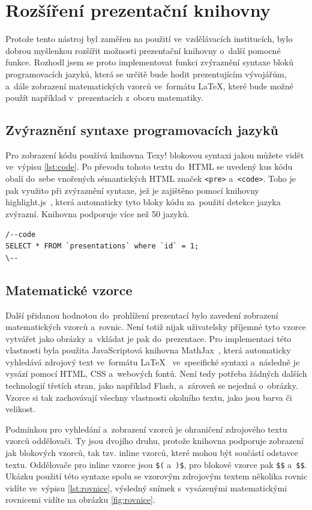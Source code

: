 \documentclass[11pt,twoside,a4paper]{book}
\begin{document}
\section{Rozšíření prezentační knihovny}
Protože tento nástroj byl zaměřen na použití ve~vzdělávacích institucích, bylo dobrou myšlenkou rozšířit možnosti prezentační knihovny o~další pomocné funkce. Rozhodl jsem se proto imple\-mentovat funkci zvýraznění syntaxe bloků programovacích jazyků, která se určitě bude hodit prezentujícím vývojářům, a~dále zobrazení matematických vzorců ve~formátu \LaTeX, které bude možné použít například v~prezentacích z~oboru matematiky.

\subsection{Zvýraznění syntaxe programovacích jazyků}
Pro zobrazení kódu používá knihovna Texy! blokovou syntaxi jakou můžete vidět ve~výpisu \ref{lst:code}. Po převodu tohoto textu do~HTML se uvedený kus kódu obalí do~sebe vnořených sémantických HTML značek \verb|<pre>| a~\verb|<code>|. Toho je pak využito při zvýraznění syntaxe, jež je zajištěno pomocí knihovny highlight.js~\cite{highlight}, která automaticky tyto bloky kódu za~použití detekce jazyka zvýrazní. Knihovna podporuje více než 50 jazyků.

\begin{lstlisting}[caption={Ukázka blokové syntaxe pro výpis kódu},label={lst:code},captionpos=b]
/--code
SELECT * FROM `presentations` where `id` = 1;
\--
\end{lstlisting}


\subsection{Matematické vzorce}
Další přidanou hodnotou do~prohlížení prezentací bylo zavedení zobrazení matematických vzorců a~rovnic. Není totiž nijak uživatelsky příjemné tyto vzorce vytvářet jako obrázky a~vkládat je pak do~prezentace. Pro imple\-mentaci této vlastnosti byla použita Java\-Scriptová knihovna MathJax~\cite{mathjax}, která automaticky vyhledává zdrojový text ve~formátu \LaTeX~\cite{latex} ve~specifické syntaxi a~následně je vysází pomocí HTML, CSS a~webových fontů. Není tedy potřeba žádných dalších technologií třetích stran, jako například Flash, a~zároveň se nejedná o~obrázky. Vzorce si tak zachovávají všechny vlastnosti okolního textu, jako jsou barva či velikost.

Podmínkou pro vyhledání a~zobrazení vzorců je ohraničení zdrojového textu vzorců oddělovači. Ty jsou dvojího druhu, protože knihovna podporuje zobrazení jak blokových vzorců, tak tzv. inline vzorců, které mohou být součástí odstavce textu. Oddělovače pro inline vzorce jsou \verb|$(| a~\verb|)$|, pro blokové vzorce pak \verb|$$| a~\verb|$$|. Ukázku použití této syntaxe spolu se vzorovým zdrojovým textem několika rovnic vidíte ve~výpisu \ref{lst:rovnice}, výsledný snímek s~vysázenými matematickými rovnicemi vidíte na obrázku \ref{fig:rovnice}.
\end{document}
